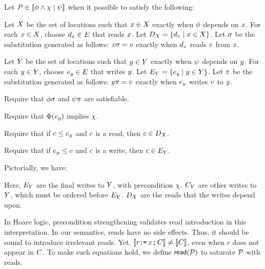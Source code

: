 \begin{definition}
  Let $P\in\llbracket\phi\land\chi\mid\psi\rrbracket$
  when it possible to satisfy the following:

  Let $X$ be the set of locations such that $x\in X$ exactly
  when $\phi$ depends on $x$.  For each $x\in X$, choose
  $d_x\in E$ that reads $x$.
  Let $D_X=\{d_x\mid x\in X\}$.
  Let $\sigma$ be the substitution generated %
  as follows:
  $x\sigma = v$ exactly when $d_x$ reads $v$ from $x$.

  Let $Y$ be the set of locations such that $y\in Y$ exactly
  when $\psi$ depends on $y$.  For each $y\in Y$, choose
  $e_y\in E$ that writes $y$.
  Let $E_Y=\{e_y\mid y\in Y\}$.
  Let $\pi$ be the substitution generated %
  as follows:
  $y\pi = v$ exactly when $e_y$ writes $v$ to $y$.

  Require that $\phi\sigma$ and $\psi\pi$ are satisfiable.

  Require that $\Phi(e_y)$ implies $\chi$.
  
  Require that if $c\le e_y$ and $c$ is a read, then $c\in D_X$.

  Require that if $e_y\le c$ and $c$ is a write, then $c\in E_Y$.
\end{definition}
Pictorially, we have:
\begin{tikzdisplay}[node distance=.1ex and 2em]
\end{tikzdisplay}
Here, $E_Y$ are the final writes to $Y$, with precondition $\chi$.
$C_Y$ are other writes to $Y$, which must be ordered before $E_Y$.
$D_X$ are the reads that the writes depend upon.

In Hoare logic, precondition strengthening validates read introduction in
this interpretation.  In our semantics, reads have no side effects.  Thus, it
should be sound to introduce irrelevant reads.  Yet,
$\llbracket r\texttt{:}\mkern-1mu\texttt{=}\, x\texttt{;}\,\allowbreak C\rrbracket\neq \llbracket C\rrbracket$, even when $r$ does not appear in
$C$.  To make such equations hold, we define ${\mathsf{read}}(\mathcal{P})$ to saturate
$\mathcal{P}$ with reads.

